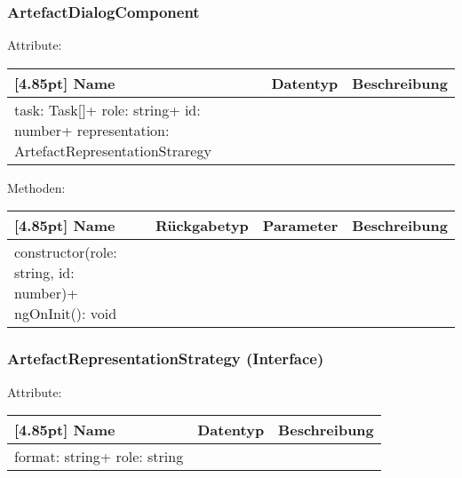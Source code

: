         	\subsubsection{ArtefactDialogComponent}
        	
        	    Attribute:
                \begin{center}
                	\renewcommand{\arraystretch}{1.5}
                    \setlength\tabcolsep{5pt}
                	\begin{tabularx}{\textwidth}{|l|l|X|}
                		\hline
                        \rowcolor[gray]{0.75}[4.85pt]            		
                        Name & Datentyp & Beschreibung \\ \hline
                        task: Task[]+ role: string+ id: number+ representation: ArtefactRepresentationStraregy
                        & &  \\ \hline
                	\end{tabularx}
                \end{center}
                
                Methoden:
        		\begin{center}
                \setlength\tabcolsep{5pt}
                	\renewcommand{\arraystretch}{1.5}
                    	\begin{tabularx}{\textwidth}{|l|l|l|X|}
                    	\hline
                    	\rowcolor[gray]{0.75}[4.85pt]
                		Name & Rückgabetyp & Parameter & Beschreibung \\ \hline
                		constructor(role: string, id: number)+ ngOnInit(): void
                        & & &  \\ \hline
                        \end{tabularx}
        		\end{center}
        	
        	\subsubsection{ArtefactRepresentationStrategy (Interface)}
        	
        	    Attribute:
                \begin{center}
                	\renewcommand{\arraystretch}{1.5}
                    \setlength\tabcolsep{5pt}
                	\begin{tabularx}{\textwidth}{|l|l|X|}
                		\hline
                        \rowcolor[gray]{0.75}[4.85pt]            		
                        Name & Datentyp & Beschreibung \\ \hline
                        format: string+ role: string
                        & &  \\ \hline
                	\end{tabularx}
                \end{center}
                
